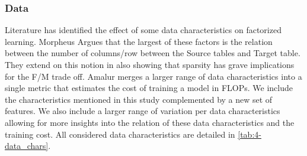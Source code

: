 \subsubsection{Data}
Literature has identified the effect of some data characteristics on factorized learning. Morpheus \cite{morpheus} Argues that the largest of these factors is the relation between the number of columns/row between the Source tables and Target table. They extend on this notion in \cite{MorpheusFIEnablingOptimizingNonlinear2019} also showing that sparsity has grave implications for the F/M trade off. Amalur \cite{amalur} merges a larger range of data characteristics into a single metric that estimates the cost of training a model in FLOPs. We include the characteristics mentioned in this study complemented by a new set of features. We also include a larger range of variation per data characteristics allowing for more insights into the relation of these data characteristics and the training cost. All considered data characteristics are detailed in \autoref{tab:4-data_chars}.


